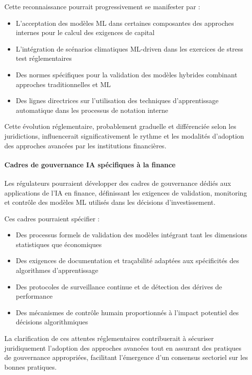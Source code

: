 Cette reconnaissance pourrait progressivement se manifester par :
\begin{itemize}
    \item L'acceptation des modèles ML dans certaines composantes des approches internes pour le calcul des exigences de capital
    \item L'intégration de scénarios climatiques ML-driven dans les exercices de stress test réglementaires
    \item Des normes spécifiques pour la validation des modèles hybrides combinant approches traditionnelles et ML
    \item Des lignes directrices sur l'utilisation des techniques d'apprentissage automatique dans les processus de notation interne
\end{itemize}

Cette évolution réglementaire, probablement graduelle et différenciée selon les juridictions, influencerait significativement le rythme et les modalités d'adoption des approches avancées par les institutions financières.

\paragraph{Cadres de gouvernance IA spécifiques à la finance} 
Les régulateurs pourraient développer des cadres de gouvernance dédiés aux applications de l'IA en finance, définissant les exigences de validation, monitoring et contrôle des modèles ML utilisés dans les décisions d'investissement.

Ces cadres pourraient spécifier :
\begin{itemize}
    \item Des processus formels de validation des modèles intégrant tant les dimensions statistiques que économiques
    \item Des exigences de documentation et traçabilité adaptées aux spécificités des algorithmes d'apprentissage
    \item Des protocoles de surveillance continue et de détection des dérives de performance
    \item Des mécanismes de contrôle humain proportionnés à l'impact potentiel des décisions algorithmiques
\end{itemize}

La clarification de ces attentes réglementaires contribuerait à sécuriser juridiquement l'adoption des approches avancées tout en assurant des pratiques de gouvernance appropriées, facilitant l'émergence d'un consensus sectoriel sur les bonnes pratiques.

